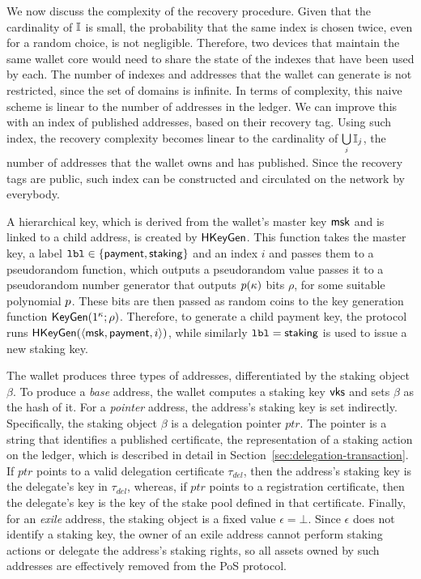 We now discuss the complexity of the recovery procedure. Given that the
cardinality of $\mathbb{I}$ is small, the probability that the same index is
chosen twice, even for a random choice, is not negligible. Therefore, two
devices that maintain the same wallet core would need to share the state of the
indexes that have been used by each. The number of indexes and addresses that
the wallet can generate is not restricted, since the set of domains is
infinite. In terms of complexity, this naive scheme is linear to the number of
addresses in the ledger. We can improve this with an index of published
addresses, based on their recovery tag. Using such index, the recovery
complexity becomes linear to the cardinality of
$\bigcup\limits_{{\scriptscriptstyle j}} \mathbb{I}_j$, \ie the number of
addresses that the wallet owns and has published. Since the recovery tags are
public, such index can be constructed and circulated on the network by
everybody.

A hierarchical key, which is derived from the wallet's master key
$\mathsf{msk}$ and is linked to a child address, is created by
$\mathsf{HKeyGen}$. This function takes the master key, a label
$\texttt{lbl} \in \{ \mathsf{payment}, \mathsf{staking} \}$ and an index $i$ and
passes them to a pseudorandom function, which outputs a pseudorandom value
passes it to a pseudorandom number generator that outputs $p(\kappa)$
bits $\rho$, for some suitable polynomial $p$. These bits are then passed
as random coins to the key generation function $\mathsf{KeyGen}(1^\kappa;
\rho)$. Therefore, to generate a child payment key, the protocol runs
$\mathsf{HKeyGen}(\langle \mathsf{msk}, \mathsf{payment}, i \rangle)$, while
similarly $\texttt{lbl} = \mathsf{staking}$ is used to issue a new staking
key.

The wallet produces three types of addresses, differentiated by the staking
object $\beta$. To produce a \emph{base} address, the wallet computes a staking
key $\mathsf{vks}$ and sets $\beta$ as the hash of it. For a
\emph{pointer} address, the address's staking key is set indirectly.
Specifically, the staking object $\beta$ is a delegation pointer $ptr$. The
pointer is a string that identifies a published certificate, \ie the
representation of a staking action on the ledger, which is described in detail
in Section~\ref{sec:delegation-transaction}. If $ptr$ points to a valid
delegation certificate $\tau_{del}$, then the address's staking key is the
delegate's key in $\tau_{del}$, whereas, if $ptr$ points to a registration
certificate, then the delegate's key is the key of the stake pool defined in
that certificate.  Finally, for an \emph{exile} address, the staking object is
a fixed value $\epsilon = \bot$. Since $\epsilon$ does not identify a staking
key, the owner of an exile address cannot perform staking actions or delegate
the address's staking rights, so all assets owned by such addresses are
effectively removed from the PoS protocol.


